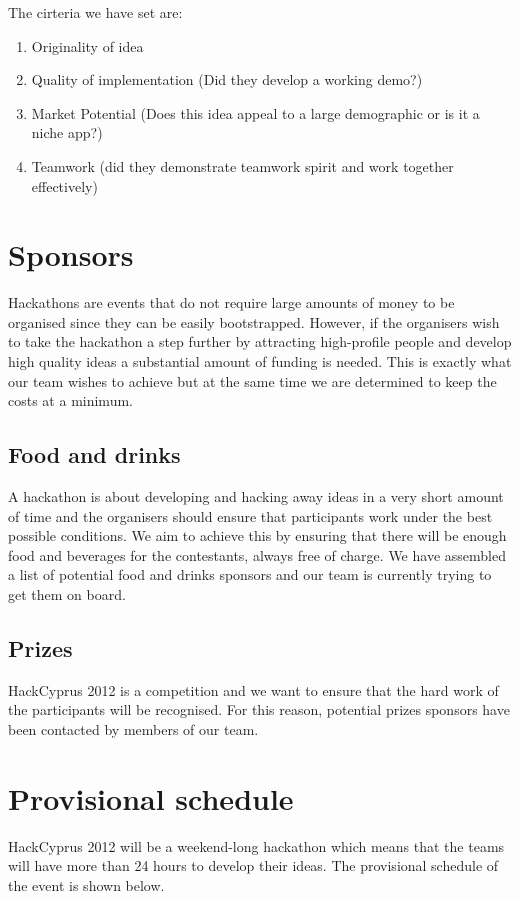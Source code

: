 \documentclass[a4paper,11pt]{report}
\begin{document}
The cirteria we have set are:
\begin{enumerate}
  \item Originality of idea
  \item Quality of implementation (Did they develop a working demo?) 
  \item Market Potential (Does this idea appeal to a large demographic or is it a niche app?)
  \item Teamwork (did they demonstrate teamwork spirit and work together effectively)
\end{enumerate}

\section{Sponsors}
Hackathons are events that do not require large amounts of money to be organised since they can be easily bootstrapped. However, if the organisers wish to take the hackathon a step further by attracting high-profile people and develop high quality ideas a substantial amount of funding is needed. This is exactly what our team wishes to achieve but at the same time we are determined to keep the costs at a minimum. 
 
\subsection{Food and drinks}
A hackathon is about developing and hacking away ideas in a very short amount of time and the organisers should ensure that participants work under the best possible conditions. We aim to achieve this by ensuring that there will be enough food and beverages for the contestants, always free of charge. We have assembled a list of potential food and drinks sponsors and our team is currently trying to get them on board.  

\subsection{Prizes}
HackCyprus 2012 is a competition and we want to ensure that the hard work of the participants will be recognised. For this reason, potential prizes sponsors have been contacted by members of our team. 

\section{Provisional schedule}
HackCyprus 2012 will be a weekend-long hackathon which means that the teams will have more than 24 hours to develop their ideas. The provisional schedule of the event is shown below. \\
\end{document}
